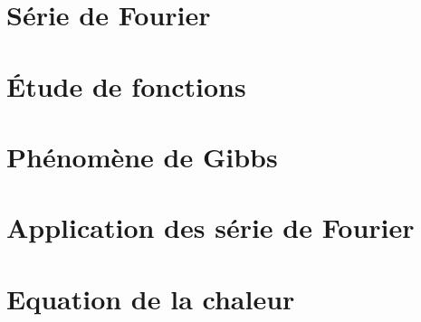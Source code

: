 \documentclass[a4paper,12pt]{report}
\begin{document}
\newpage
\null
\newpage
\tableofcontents


\chapter{S\'erie de Fourier}
	
\chapter{\'Etude de fonctions}

\chapter{Ph\'enom\`ene de Gibbs}

\chapter{Application des s\'erie de Fourier}

\chapter{Equation de la chaleur}

\listoffigures
\end{document}
